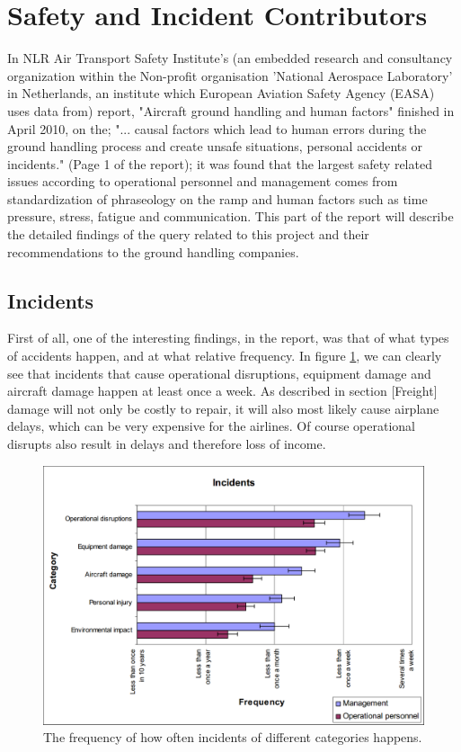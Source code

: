 \section{Safety and Incident Contributors}
In NLR Air Transport Safety Institute's (an embedded research and consultancy organization within the Non-profit organisation 'National Aerospace Laboratory' in Netherlands, an institute which European Aviation Safety Agency (EASA) uses data from) report, "Aircraft ground handling and human factors" finished in April 2010, on the; "... causal factors which lead to human errors during the ground handling process and create unsafe situations, personal accidents or incidents." (Page 1 of the report); it was found that the largest safety related issues according to operational personnel and management comes from standardization of phraseology on the ramp and human factors such as time pressure, stress, fatigue and communication. This part of the report will describe the detailed findings of the query related to this project and their recommendations to the ground handling companies.

\subsection{Incidents}
First of all, one of the interesting findings, in the report, was that of what types of accidents happen, and at what relative frequency. In figure \ref{FrequencyOfIncidents}, we can clearly see that incidents that cause operational disruptions, equipment damage and aircraft damage happen at least once a week. As described in section [Freight] damage will not only be costly to repair, it will also most likely cause airplane delays, which can be very expensive for the airlines. Of course operational disrupts also result in delays and therefore loss of income.

\begin{figure}[H]
\centering
\includegraphics[width=\textwidth]{Grafik/FrequencyOfIncidents}
\caption{The frequency of how often incidents of different categories happens.}
\label{FrequencyOfIncidents}
\end{figure}

